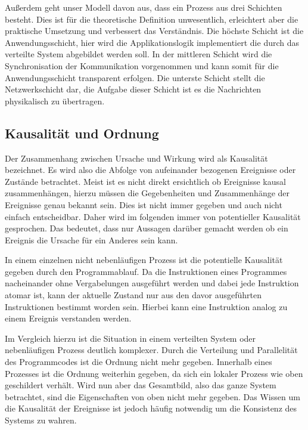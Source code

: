 Außerdem geht unser Modell davon aus, dass ein Prozess aus drei Schichten besteht.
Dies ist für die theoretische Definition unwesentlich, erleichtert aber die praktische Umsetzung und verbessert das Verständnis.
Die höchste Schicht ist die Anwendungsschicht, hier wird die Applikationslogik implementiert die durch das verteilte System abgebildet werden soll.
In der mittleren Schicht wird die Synchronisation der Kommunikation vorgenommen und kann somit für die Anwendungsschicht transparent  erfolgen.
Die unterste Schicht stellt die Netzwerkschicht dar, die Aufgabe dieser Schicht ist es die Nachrichten physikalisch zu übertragen.

\subsection{Kausalität und Ordnung}
\label{cap:ordnung}
Der Zusammenhang zwischen Ursache und Wirkung wird als Kausalität bezeichnet.
Es wird also die Abfolge von aufeinander bezogenen Ereignisse oder Zustände betrachtet.
Meist ist es nicht direkt ersichtlich ob Ereignisse kausal zusammenhängen, hierzu müssen die Gegebenheiten und Zusammenhänge der Ereignisse genau bekannt sein.
Dies ist nicht immer gegeben und auch nicht einfach entscheidbar. %
Daher wird im folgenden immer von potentieller Kausalität gesprochen.
Das bedeutet, dass nur Aussagen darüber gemacht werden ob ein Ereignis die Ursache für ein Anderes sein kann.

In einem einzelnen nicht nebenläufigen Prozess ist die potentielle Kausalität gegeben durch den Programmablauf.
Da die Instruktionen eines Programmes nacheinander ohne Vergabelungen ausgeführt werden und dabei jede Instruktion atomar ist, kann der aktuelle Zustand nur aus den davor ausgeführten Instruktionen bestimmt worden sein.
Hierbei kann eine Instruktion analog zu einem Ereignis verstanden werden.

Im Vergleich hierzu ist die Situation in einem verteilten System oder nebenläufigen Prozess deutlich komplexer.
Durch die Verteilung und Parallelität des Programmcodes ist die  Ordnung nicht mehr gegeben.
Innerhalb eines Prozesses ist die Ordnung weiterhin gegeben, da sich ein lokaler Prozess wie oben geschildert verhält.
Wird nun aber das Gesamtbild, also das ganze System betrachtet, sind die Eigenschaften von oben nicht mehr gegeben.
Das Wissen um die Kausalität der Ereignisse ist jedoch häufig notwendig um die Konsistenz des Systems zu wahren.

